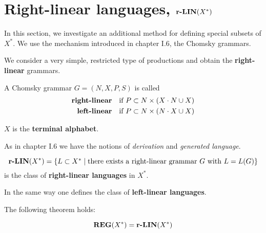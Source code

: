 \section{Right-linear languages, \texorpdfstring{$\mbox{{\bf r-LIN}}(X^*)$}{r-LIN(X*)}}

In this section, we investigate an additional method for defining special
subsets of $X^*$. We use the mechanism introduced in chapter I.6, the Chomsky
grammars.

We consider a very simple, restricted type of productions and obtain the {\bf
right-linear} grammars.

\begin{definition}
A Chomsky grammar $G = (N, X, P, S)$ is called
\begin{eqnarray*}
\text{\bf right-linear} & & \text{if } P \subset N \times (X \cdot N \cup X) \\
\text{\bf left-linear}  & & \text{if } P \subset N \times (N \cdot X \cup X)
\end{eqnarray*}
\end{definition}

$X$ is the {\bf terminal alphabet}.

As in chapter I.6 we have the notions of {\em derivation} and {\em generated
language}.

\bigskip
\begin{definition}
\[ \mbox{{\bf r-LIN}}(X^*) = \mbox{$\{L \subset X^* \mid \text{there exists a right-linear
grammar $G$ with } L = L(G)\}$} \]
is the class of {\bf right-linear languages} in $X^*$.
\end{definition}

In the same way one defines the class of {\bf left-linear languages}.

The following theorem holds:

\begin{theorem}
\[ \mbox{{\bf REG}}(X^*) = \mbox{{\bf r-LIN}}(X^*) \]
\end{theorem}

